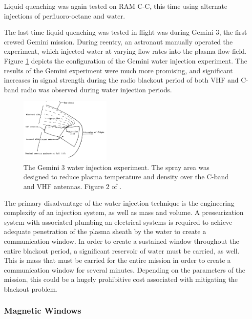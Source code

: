 \documentclass[twocolumn]{article}
\begin{document}
			Liquid quenching was again tested on RAM C-C, this time using alternate injections of perfluoro-octane and water.\cite{rybak_causes_1970}
			
			The last time liquid quenching was tested in flight was during Gemini 3, the first crewed Gemini mission.\cite{schroeder_flight_1968}
			During reentry, an astronaut manually operated the experiment, which injected water at varying flow rates into the plasma flow-field.
			Figure \ref{fig:GeminiWaterDiagram} depicts the configuration of the Gemini water injection experiment.
			The results of the Gemini experiment were much more promising, and significant increases in signal strength during the radio blackout period of both VHF and C-band radio was observed during water injection periods.\cite{schroeder_flight_1968}
			\begin{figure}
				\centering
				\includegraphics[width=0.4\textwidth]{Images/GeminiWaterDiagram}
				\caption[Diagram of the Gemini 3 water injection experiment.]{The Gemini 3 water injection experiment. The spray area was designed to reduce plasma temperature and density over the C-band and VHF antennas. Figure 2 of \cite{schroeder_flight_1968}.}
				\label{fig:GeminiWaterDiagram}
			\end{figure}
			
			The primary disadvantage of the water injection technique is the engineering complexity of an injection system, as well as mass and volume.
			A pressurization system with associated plumbing an electrical systems is required to achieve adequate penetration of the plasma sheath by the water to create a communication window.
			In order to create a sustained window throughout the entire blackout period, a significant reservoir of water must be carried, as well.
			This is mass that must be carried for the entire mission in order to create a communication window for several minutes.
			Depending on the parameters of the mission, this could be a hugely prohibitive cost associated with mitigating the blackout problem.
		
		\subsubsection*{Magnetic Windows}
		
\end{document}
